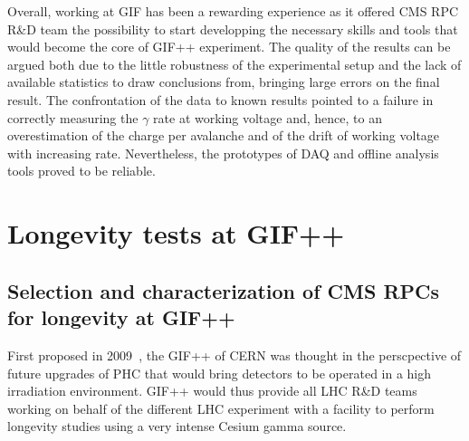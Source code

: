 	Overall, working at GIF has been a rewarding experience as it offered CMS RPC R\&D team the possibility to start developping the necessary skills and tools that would become the core of GIF++ experiment. The quality of the results can be argued both due to the little robustness of the experimental setup and the lack of available statistics to draw conclusions from, bringing large errors on the final result. The confrontation of the data to known results pointed to a failure in correctly measuring the $\gamma$ rate at working voltage and, hence, to an overestimation of the charge per avalanche and of the drift of working voltage with increasing rate. Nevertheless, the prototypes of DAQ and offline analysis tools proved to be reliable.

\section{Longevity tests at \acs{GIF++}}
\label{chapt5:sec:GIFpptests}

	\subsection{Selection and characterization of CMS RPCs for longevity at GIF++}
	\label{chapt5:ssec:selection}

	First proposed in 2009~\cite{GIF++2009}, the \acl{GIF++} of CERN was thought in the perscpective of future upgrades of PHC that would bring detectors to be operated in a high irradiation environment. GIF++ would thus provide all LHC R\&D teams working on behalf of the different LHC experiment with a facility to perform longevity studies using a very intense Cesium gamma source.
	
